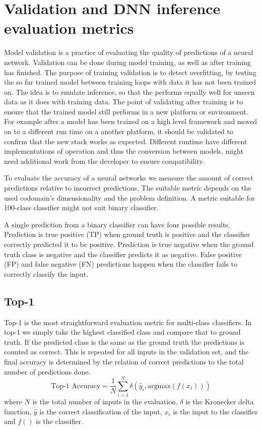 \documentclass[12pt,a4paper,english
]{tunithesis}
\begin{document}
\section{Validation and DNN inference evaluation metrics}
Model validation is a practice of evaluating the quality of predictions of a neural network. Validation can be done during model training, as well as after training has finished. The purpose of training validation is to detect overfitting, by testing the so far trained model between training loops with data it has not been trained on. The idea is to emulate inference, so that the performs equally well for unseen data as it does with training data. The point of validating after training is to ensure that the trained model still performs in a new platform or environment. For example after a model has been trained on a high level framework and moved on to a different run time on a another platform, it should be validated to confirm that the new stack works as expected. Different runtime have different implementations of operation and thus the conversion between models, might need additional work from the developer to ensure compatibility.

To evaluate the accuracy of a neural networks we measure the amount of correct predictions relative to incorrect predictions. The suitable metric depends on the used codomain's dimensionality and the problem definition. A metric suitable for 100-class classifier might not suit binary classifier.

A single prediction from a binary classifier can have four possible results. Prediction is true positive (TP) when ground truth is positive and the classifier correctly predicted it to be positive. Prediction is true negative when the ground truth class is negative and the classifier predicts it as negative. False positive (FP) and false negative (FN) predictions happen when the classifier fails to correctly classify the input.

\subsection{Top-1}
Top-1 is the most straightforward evaluation metric for multi-class classifiers. In top-1 we simply take the highest classified class and compare that to ground truth. If the predicted class is the same as the ground truth the predictions is counted as correct. This is repeated for all inputs in the validation set, and the final accuracy is determined by the relation of correct predictions to the total number of predictions done.
\begin{equation}
\text{Top-1 Accuracy} = \frac{1}{N} \sum_{i=1}^{N} \delta(\hat{y}_i, \text{argmax}(f(x_i)))
\end{equation}
where $N$ is the total number of inputs in the evaluation, $\delta$ is the Kronecker delta function, $\hat{y}$ is the correct classification of the input, $x_i$ is the input to the classifier and $f()$ is the classifier.
\end{document}
